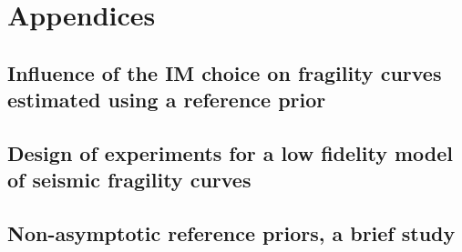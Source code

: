 \documentclass[a4paper]{book}
\begin{document}



\appendix
\part*{Appendices}\label{part:appendix}


\chapter{Influence of the IM choice on fragility curves estimated using a reference prior}\label{app:chap:uncecomp}



\chapter{Design of experiments for a low fidelity model of seismic fragility curves}\label{app:chap:ESAIM}




\chapter{Non-asymptotic reference priors, a brief study}





 
 

\printbibliography[heading=chapter,title=Bibliography]
\end{document}
